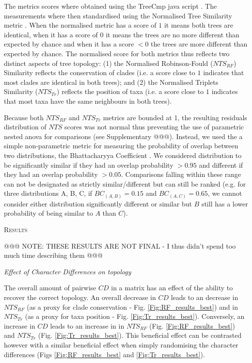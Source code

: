 \documentclass[12pt,letterpaper]{article}
\renewcommand{\section}[1]{%
\bigskip
\begin{center}
\begin{Large}
\normalfont\scshape #1
\medskip
\end{Large}
\end{center}}
\renewcommand{\subsection}[1]{%
\bigskip
\begin{center}
\begin{large}
\normalfont\itshape #1
\end{large}
\end{center}}
\begin{document}
The metrics scores where obtained using the TreeCmp java script \citep{Bogdanowicz2012}.
The measurements where then standardised using the Normalised Tree Similarity metric \citep[$NTS$; i.e. centering the metrics scores using the mean metric score for 1000 pairwise comparisons between random trees with $n$ taxa;][]{Bogdanowicz2012,Guillerme2016146}.
When the normalised metric has a score of $1$ it means both trees are identical, when it has a score of $0$ it means the trees are no more different than expected by chance and when it has a score $<0$ the trees are more different than expected by chance.
The normalised score for both metrics thus reflects two distinct aspects of tree topology: (1) the Normalised Robinson-Fould ($NTS_{RF}$) Similarity reflects the conservation of clades (i.e. a score close to $1$ indicates that most clades are identical in both trees); and (2) the Normalised Triplets Similarity ($NTS_{Tr}$) reflects the position of taxa (i.e. a score close to $1$ indicates that most taxa have the same neighbours in both trees).

Because both $NTS_{RF}$ and $NTS_{Tr}$ metrics are bounded at 1, the resulting residuals distribution of $NTS$ scores was not normal thus preventing the use of parametric nested anova for comparisons (see Supplementary @@@).
Instead, we used the a simple non-parametric metric for measuring the probability of overlap between two distributions, the Bhattacharyya Coefficient \citep[$BC$;][]{Bhattacharyya,Guillerme2016146,soto2016trace}.
We considered distribution to be significantly similar if they had an overlap probability $>0.95$ and different if they had an overlap probability $>0.05$.
Comparisons falling within these range can not be designated as strictly similar/different but can still be ranked (e.g. for three distributions A, B, C, if $BC_{(A,B)} = 0.15$ and $BC_{(A,C)} = 0.65$, we cannot consider either distribution significantly different or similar but $B$ still has a lower probability of being similar to $A$ than $C$).


\section{Results}

@@@ NOTE: THESE RESULTS ARE NOT FINAL - I thus didn't spend too much time describing them @@@

\subsection{Effect of Character Differences on topology}
The overall amount of pairwise $CD$ in a matrix has an effect of the ability to recover the correct topology.
An overall decrease in $CD$ leads to an decrease in $NTS_{RF}$ (as a proxy for clade conservation - Fig. \ref{Fig:RF_results_best}) and in $NTS_{Tr}$ (as a proxy for taxa position - Fig. \ref{Fig:Tr_results_best}).
Conversely, an increase in $CD$ leads to an increase in in $NTS_{RF}$ (Fig. \ref{Fig:RF_results_best}) and $NTS_{Tr}$ (Fig. \ref{Fig:Tr_results_best}).
This beneficial effect can be contrasted however with a similar beneficial effect when simply randomising the character differences (Figs \ref{Fig:RF_results_best} and \ref{Fig:Tr_results_best}).
\end{document}
